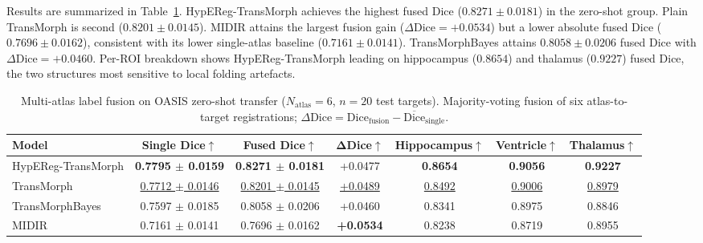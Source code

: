 \documentclass[jimaging,article,submit,pdftex,moreauthors]{Definitions/mdpi}
\begin{document}
Results are summarized in Table~\ref{tab:multiatlas}. HypEReg-TransMorph achieves the highest fused Dice (\(0.8271\pm0.0181\)) in the zero-shot group. Plain TransMorph is second (\(0.8201\pm0.0145\)). MIDIR attains the largest fusion gain (\(\Delta\mathrm{Dice}=+0.0534\)) but a lower absolute fused Dice (\(0.7696\pm0.0162\)), consistent with its lower single-atlas baseline (\(0.7161\pm0.0141\)). TransMorphBayes attains \(0.8058\pm0.0206\) fused Dice with \(\Delta\mathrm{Dice}=+0.0460\). Per-ROI breakdown shows HypEReg-TransMorph leading on hippocampus (\(0.8654\)) and thalamus (\(0.9227\)) fused Dice, the two structures most sensitive to local folding artefacts.

\begin{table}[H]
\caption{Multi-atlas label fusion on OASIS zero-shot transfer (\(N_{\mathrm{atlas}}=6\), \(n=20\) test targets). Majority-voting fusion of six atlas-to-target registrations; \(\Delta\mathrm{Dice}=\mathrm{Dice}_{\mathrm{fusion}}-\overline{\mathrm{Dice}}_{\mathrm{single}}\).\label{tab:multiatlas}}
\centering
\scriptsize
\setlength{\tabcolsep}{3pt}
\begin{tabularx}{\textwidth}{lcccccc}
\toprule
\textbf{Model} & \textbf{Single Dice\(\uparrow\)} & \textbf{Fused Dice\(\uparrow\)} & \(\boldsymbol{\Delta}\)\textbf{Dice\(\uparrow\)} & \textbf{Hippocampus\(\uparrow\)} & \textbf{Ventricle\(\uparrow\)} & \textbf{Thalamus\(\uparrow\)}\\
\midrule
HypEReg-TransMorph & \textbf{0.7795 \(\pm\) 0.0159} & \textbf{0.8271 \(\pm\) 0.0181} & +0.0477 & \textbf{0.8654} & \textbf{0.9056} & \textbf{0.9227} \\
TransMorph & \underline{0.7712 \(\pm\) 0.0146} & \underline{0.8201 \(\pm\) 0.0145} & \underline{+0.0489} & \underline{0.8492} & \underline{0.9006} & \underline{0.8979} \\
TransMorphBayes & 0.7597 \(\pm\) 0.0185 & 0.8058 \(\pm\) 0.0206 & +0.0460 & 0.8341 & 0.8975 & 0.8846 \\
MIDIR & 0.7161 \(\pm\) 0.0141 & 0.7696 \(\pm\) 0.0162 & \textbf{+0.0534} & 0.8238 & 0.8719 & 0.8955 \\
\bottomrule
\end{tabularx}
\end{table}
\end{document}
